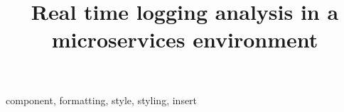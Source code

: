 \documentclass[conference]{IEEEtran}
\begin{document}
\title{Real time logging analysis in a microservices environment\\
}

\author{
}

\maketitle


\begin{IEEEkeywords}
component, formatting, style, styling, insert
\end{IEEEkeywords}






\vspace{12pt}
\end{document}
